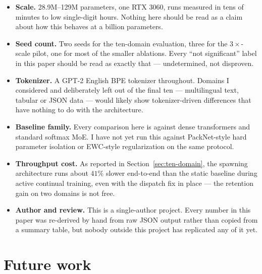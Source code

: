 \documentclass[11pt,letterpaper]{article}
\begin{document}
\begin{itemize}[leftmargin=1.4em]
\item \textbf{Scale.} 28.9M--129M parameters, one RTX 3060, runs measured in tens of minutes to low single-digit hours. Nothing here should be read as a claim about how this behaves at a billion parameters.
\item \textbf{Seed count.} Two seeds for the ten-domain evaluation, three for the $3\times$-scale pilot, one for most of the smaller ablations. Every ``not significant'' label in this paper should be read as exactly that --- undetermined, not disproven.
\item \textbf{Tokenizer.} A GPT-2 English BPE tokenizer throughout. Domains I considered and deliberately left out of the final ten --- multilingual text, tabular or JSON data --- would likely show tokenizer-driven differences that have nothing to do with the architecture.
\item \textbf{Baseline family.} Every comparison here is against dense transformers and standard softmax MoE. I have not yet run this against PackNet-style hard parameter isolation or EWC-style regularization on the same protocol.
\item \textbf{Throughput cost.} As reported in Section~\ref{sec:ten-domain}, the spawning architecture runs about $41\%$ slower end-to-end than the static baseline during active continual training, even with the dispatch fix in place --- the retention gain on two domains is not free.
\item \textbf{Author and review.} This is a single-author project. Every number in this paper was re-derived by hand from raw JSON output rather than copied from a summary table, but nobody outside this project has replicated any of it yet.
\end{itemize}

\section{Future work}
\label{sec:future}
\end{document}
